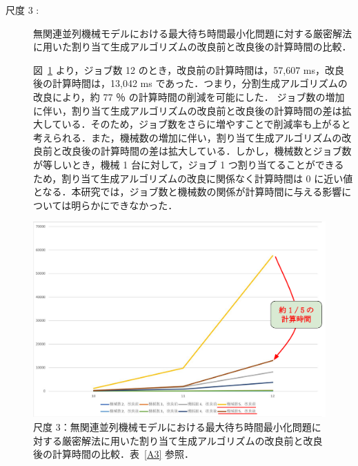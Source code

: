 \documentclass[12pt]{optlab-bachelor}
\begin{document}
\begin{description}
  \item[尺度 3 :] 無関連並列機械モデルにおける最大待ち時間最小化問題に対する厳密解法に用いた割り当て生成アルゴリズムの改良前と改良後の計算時間の比較．

  図~\ref{5.3} より，ジョブ数 12 のとき，改良前の計算時間は，57,607 ms，改良後の計算時間は，13,042 ms であった．つまり，分割生成アルゴリズムの改良により，約 77 ％ の計算時間の削減を可能にした．
  ジョブ数の増加に伴い，割り当て生成アルゴリズムの改良前と改良後の計算時間の差は拡大している．そのため，ジョブ数をさらに増やすことで削減率も上がると考えられる．また，機械数の増加に伴い，割り当て生成アルゴリズムの改良前と改良後の計算時間の差は拡大している．しかし，機械数とジョブ数が等しいとき，機械 1 台に対して，ジョブ 1 つ割り当てることができるため，割り当て生成アルゴリズムの改良に関係なく計算時間は 0 に近い値となる．本研究では，ジョブ数と機械数の関係が計算時間に与える影響については明らかにできなかった．
\end{description}
\begin{figure}[ht]
  \centering
  \includegraphics[width = 15cm]{figure/rgfTimeUn.pdf}
  \caption{尺度 3：無関連並列機械モデルにおける最大待ち時間最小化問題に対する厳密解法に用いた割り当て生成アルゴリズムの改良前と改良後の計算時間の比較．表~\ref{A3} 参照．}
  \label{5.3}
\end{figure}
\end{document}
